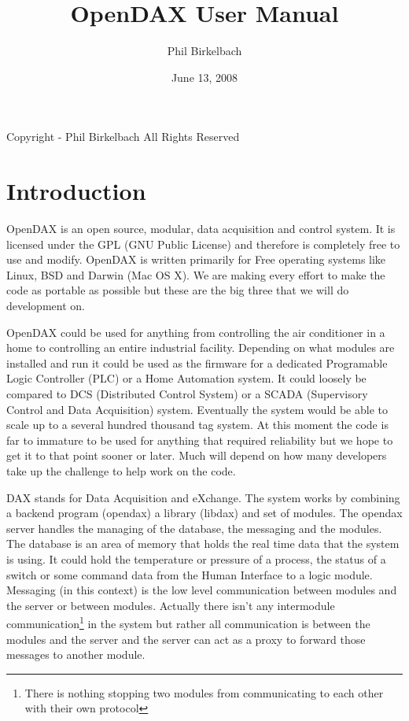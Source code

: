 \documentclass[executivepaper,10pt]{book}
\title{OpenDAX User Manual}
\date{June 13, 2008}
\author{Phil Birkelbach}
\begin{document}
\begin{titlepage}
\maketitle

\begin{flushleft}
Copyright  - Phil Birkelbach\linebreak
All Rights Reserved
\end{flushleft}

\end{titlepage}
\chapter*{Introduction}
OpenDAX is an open source, modular, data acquisition and control system. It is licensed under the GPL (GNU Public License) and therefore is completely free to use and modify. OpenDAX is written primarily for Free operating systems like Linux, BSD and Darwin (Mac OS X). We are making every effort to make the code as portable as possible but these are the big three that we will do development on.

OpenDAX could be used for anything from controlling the air conditioner in a home to controlling an entire industrial facility. Depending on what modules are installed and run it could be used as the firmware for a dedicated Programable Logic Controller (PLC) or a Home Automation system. It could loosely be compared to DCS (Distributed Control System) or a SCADA (Supervisory Control and Data Acquisition) system. Eventually the system would be able to scale up to a several hundred thousand tag system. At this moment the code is far to immature to be used for anything that required reliability but we hope to get it to that point sooner or later. Much will depend on how many developers take up the challenge to help work on the code.

DAX stands for Data Acquisition and eXchange. The system works by combining a backend program (opendax) a library (libdax) and set of modules. The opendax server handles the managing of the database, the messaging and the modules.  The database is an area of memory that holds the real time data that the system is using.  It could hold the temperature or pressure of a process, the status of a switch or some command data from the Human Interface to a logic module.  Messaging (in this context) is the low level communication between modules and the server or between modules.  Actually there isn't any intermodule communication\footnote{There is nothing stopping two modules from communicating to each other with their own protocol} in the system but rather all communication is between the modules and the server and the server can act as a proxy to forward those messages to another module.
\end{document}

